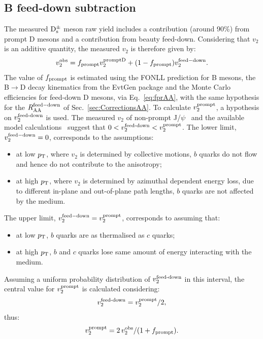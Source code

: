 \subsection{B feed-down subtraction}
\label{sec:FDv2}
The measured ${\rm D_s^{\pm}}$ meson raw yield includes a contribution (around 90\%)
from prompt D mesons and a contribution from beauty feed-down.
Considering that $v_2$ is an additive quantity, the measured $v_2$ is therefore given by:
\begin{equation}
\label{eq:bfeed}
v_2^{\rm obs}=f_{\rm prompt} v_2^{\rm promptD} + (1-f_{\rm prompt})v_2^{\rm feed-down}.
\end{equation}
The value of $f_{\rm prompt}$ is estimated using the FONLL prediction for B mesons, 
the B$\rightarrow$D decay kinematics from the EvtGen package and
the Monte Carlo efficiencies for feed-down D mesons, via Eq.~\ref{eq:fprAA},
with the same hypothesis for the $R_{\rm AA}^{\rm feed-down}$ of 
Sec.~\ref{sec:CorrectionsAA}.
To calculate $v_{\rm 2}^{\rm prompt}$, a hypothesis on 
$v_{\rm 2}^{\rm feed\textnormal{-}down}$ is used.
The measured $v_2$ of non-prompt J/$\psi$~\cite{Khachatryan:2016ypw} 
and the available model calculations~\cite{Aichelin:2012ww,Uphoff:2012gb,Greco:2007sz} 
suggest that $0<v_{\rm 2}^{\rm feed\textnormal{-}down}<v_{\rm 2}^{\rm prompt}$.
The lower limit, $v_2^{\rm feed-down}=0$, corresponds to the assumptions:
\begin{itemize}
\item{at low $p_{\rm T}$, where $v_2$ is determined by collective motions, 
$b$ quarks do not flow and hence do not contribute to the anisotropy;}
\item{at high $p_{\rm T}$, where $v_2$ is determined by azimuthal dependent 
energy loss, due to different in-plane and out-of-plane path lengths, 
$b$ quarks are not affected by the medium.}
\end{itemize}
The upper limit, $v_2^{\rm feed-down}=v_2^{\rm prompt}$, corresponds to assuming that:
\begin{itemize}
\item{at low $p_{\rm T}$, $b$ quarks are as thermalised as $c$ quarks;}
\item{at high $p_{\rm T}$, $b$ and $c$ quarks lose same amount of energy interacting with the medium.}
\end{itemize}
Assuming a uniform probability distribution of $v_{\rm 2}^{\rm feed\textnormal{-}down}$ in this interval,
the central value for $v_{\rm 2}^{\rm prompt}$ is calculated 
considering:
\begin{equation}
\label{eq:hypoFD}
v_{\rm 2}^{\rm feed\textnormal{-}down}=v_{\rm 2}^{\rm prompt}/2,
\end{equation}
thus:
\begin{equation}
\label{eq:finalv2}
v_{\rm 2}^{\rm prompt}= 2\,v_{\rm 2}^{\rm obs}/(1+f_{\rm prompt}).
\end{equation}

